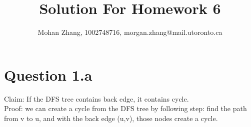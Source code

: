 \documentclass{article}
\title{Solution For Homework 6}
\author{Mohan Zhang, 1002748716, morgan.zhang@mail.utoronto.ca}
\begin{document}
\maketitle

\section{Question 1.a}
Claim: If the DFS tree contains back edge, it contains cycle.\\
Proof: we can create a cycle from the DFS tree by following step: find the path from v to u, and with the back edge (u,v), those nodes create a cycle. 
\end{document}
